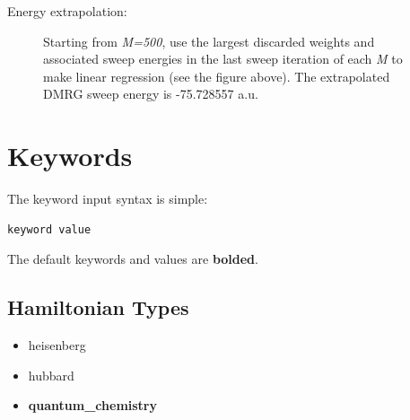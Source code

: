 \documentclass[letterpaper,10pt,english]{sphinxmanual}
\begin{document}
Energy extrapolation:
\begin{figure}[htbp]\begin{flushleft}
\capstart

\caption{Starting from \emph{M=500}, use the largest discarded weights and associated sweep energies in the last sweep iteration of each \emph{M} to make linear regression (see the figure above). The extrapolated DMRG sweep energy is -75.728557 a.u.}\end{flushleft}\end{figure}


\section{Keywords}
\label{keywords:keywords}\label{keywords::doc}
The keyword input syntax is simple:

\begin{Verbatim}[commandchars=\\\{\}]
keyword value
\end{Verbatim}

The default keywords and values are \textbf{bolded}.


\subsection{Hamiltonian Types}
\label{keywords:hamiltonian-types}\begin{itemize}
\item {} 
heisenberg

\item {} 
hubbard

\item {} 
\textbf{quantum\_chemistry}

\end{itemize}
\end{document}
